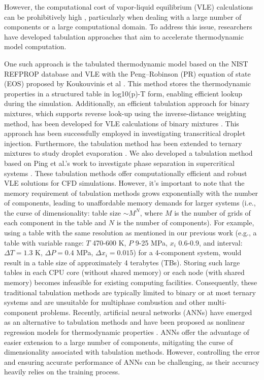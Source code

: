 However, the computational cost of vapor-liquid equilibrium (VLE) calculations can be prohibitively high \cite{yi2019numerical,yang2020real,zhang2022multicomponent}, particularly when dealing with a large number of components or a large computational domain. To address this issue, researchers have developed tabulation approaches that aim to accelerate thermodynamic model computation.
 
One such approach is the tabulated thermodynamic model based on the NIST REFPROP database and VLE with the Peng–Robinson (PR) equation of state (EOS) proposed by Koukouvinis et al \cite{koukouvinis2020high}. This method stores the thermodynamic properties in a structured table in log10(p)-T form, enabling efficient lookup during the simulation.
Additionally, an efficient tabulation approach for binary mixtures, which supports reverse look-up using the inverse-distance weighting method, has been developed for VLE calculations of binary mixtures \cite{yi2019numerical,jafari2021towards,jafari2022exploring}. This approach has been successfully employed in investigating transcritical droplet injection. Furthermore, the tabulation method has been extended to ternary mixtures to study droplet evaporation \cite{gaballa2022numerical}. We also developed a tabulation method based on Ping et al.'s work \cite{yi2019numerical} to investigate phase separation in supercritical  systems \cite{zhang2022multicomponent}. These tabulation methods offer computationally efficient and robust VLE solutions for CFD simulations. However, it's important to note that the memory requirement of tabulation methods grows exponentially with the number of components, leading to unaffordable memory demands for larger systems (i.e., the curse of dimensionality: table size $\sim M^N$, where $M$ is the number of grids of each component in the table and $N$ is the number of components). For example, using a table with the same resolution as mentioned in our previous work (e.g., a table with variable range: $T$ 470-600 K, $P$ 9-25 MPa, $x_i$ 0.6-0.9, and interval: $\Delta T = 1.3$ K, $\Delta P = 0.4$ MPa, $\Delta x_i = 0.015$) \cite{zhang2022multicomponent} for a 4-component system, would result in a table size of approximately 4 terabytes (TBs). Storing such large tables in each CPU core (without shared memory) or each node (with shared memory) becomes infeasible for existing computing facilities. Consequently, these traditional tabulation methods are typically limited to binary or at most ternary systems and are unsuitable for multiphase combustion and other multi-component problems. Recently, artificial neural networks (ANNs) have emerged as an alternative to tabulation methods and have been proposed as nonlinear regression models for thermodynamic properties \cite{wang2019accelerating,koukouvinis2022machine}. ANNs offer the advantage of easier extension to a large number of components, mitigating the curse of dimensionality associated with tabulation methods. However, controlling the error and ensuring accurate performance of ANNs can be challenging, as their accuracy heavily relies on the training process.


